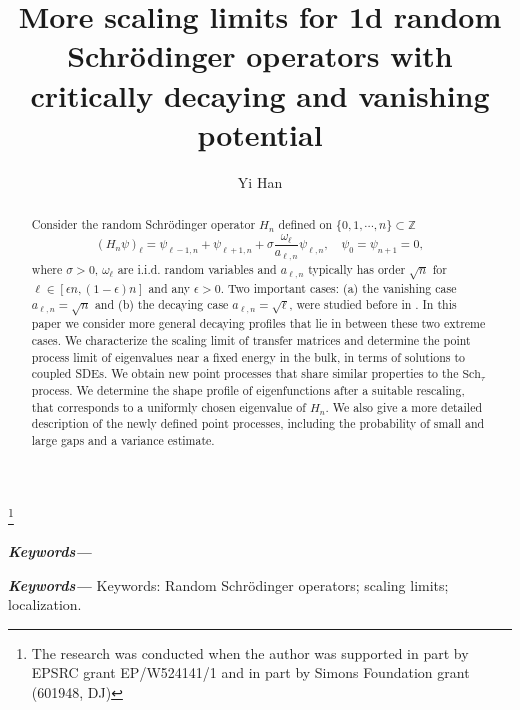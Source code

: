 \documentclass[12pt, reqno]{amsart}
\theoremstyle{definition}
\theoremstyle{remark}
\numberwithin{equation}{section}
\providecommand{\keywords}[1]
{
  \small	
  \textbf{\textit{Keywords---}} #1
}
\begin{document}
\setcounter{page}{1}

\title[Scaling limits for 1d random Schrödinger operators]{More scaling limits for 1d random Schrödinger operators with critically decaying and vanishing potential}

\author[Y.H]{Yi Han}
\address{
  Yi Han:
  \endgraf
  Department of Mathematics, Massachusetts Institute of Technology, Cambridge MA
  \endgraf
  {\it E-mail address} {\rm hanyi16@mit.edu}
  }
  





\thanks{The research was conducted when the author was supported in part by EPSRC grant EP/W524141/1 and in part by Simons Foundation grant (601948, DJ)
}

    

\begin{abstract} Consider the random Schrödinger operator $H_n$ defined on $\{0,1,\cdots,n\}\subset\mathbb{Z}$
$$
    (H_n\psi)_\ell=\psi_{\ell-1,n}+\psi_{\ell+1,n}+\sigma\frac{\omega_\ell}{a_{\ell,n}}\psi_{\ell,n},\quad \psi_0=\psi_{n+1}=0,
$$
where $\sigma>0$, $\omega_\ell$ are i.i.d. random variables and $a_{\ell,n}$ typically has order $\sqrt{n}$ for $\ell\in[\epsilon n,(1-\epsilon)n]$ and any $\epsilon>0$. Two important cases: (a) the vanishing case $a_{\ell,n}=\sqrt{n}$ and (b) the decaying case $a_{\ell,n}=\sqrt{\ell}$, were studied before in \cite{kritchevski2011scaling}. In this paper we consider more general decaying profiles that lie in between these two extreme cases. We characterize the scaling limit of transfer matrices and determine the point process limit of eigenvalues near a fixed energy in the bulk, in terms of solutions to coupled SDEs. We obtain new point processes that share similar properties to the $\text{Sch}_\tau$ process. We determine the shape profile of eigenfunctions after a suitable rescaling, that corresponds to a uniformly chosen eigenvalue of  $H_n$. We also give a more detailed description of the newly defined point processes, including the probability of small and large gaps and a variance estimate.
\end{abstract} 

\maketitle


\allowdisplaybreaks


\keywords{}

\keywords{Keywords: Random Schrödinger operators; scaling limits; localization.}
\end{document}
